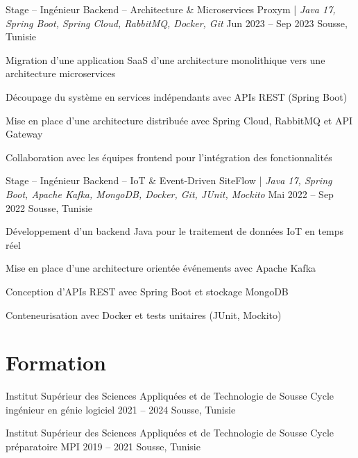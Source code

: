 \documentclass[letterpaper]{resume_config}
\begin{document}
\WorkExperience
{Stage -- Ingénieur Backend -- Architecture \& Microservices}
{Proxym | \textit{Java 17, Spring Boot, Spring Cloud, RabbitMQ, Docker, Git}}
{Jun 2023 -- Sep 2023}
{Sousse, Tunisie}
{
\item Migration d’une application SaaS d’une architecture monolithique vers une architecture microservices
\item Découpage du système en services indépendants avec APIs REST (Spring Boot)
\item Mise en place d’une architecture distribuée avec Spring Cloud, RabbitMQ et API Gateway
\item Collaboration avec les équipes frontend pour l’intégration des fonctionnalités
}

\WorkExperience
{Stage -- Ingénieur Backend -- IoT \& Event-Driven}
{SiteFlow | \textit{Java 17, Spring Boot, Apache Kafka, MongoDB, Docker, Git, JUnit, Mockito}} 
{Mai 2022 -- Sep 2022}
{Sousse, Tunisie}
{
\item Développement d’un backend Java pour le traitement de données IoT en temps réel
\item Mise en place d’une architecture orientée événements avec Apache Kafka
\item Conception d’APIs REST avec Spring Boot et stockage MongoDB
\item Conteneurisation avec Docker et tests unitaires (JUnit, Mockito)
}

\vspace{-10pt}


\section{Formation}

\EducationExperience
{Institut Supérieur des Sciences Appliquées et de Technologie de Sousse}
{Cycle ingénieur en génie logiciel}
{2021 -- 2024}
{Sousse, Tunisie}

\EducationExperience
{Institut Supérieur des Sciences Appliquées et de Technologie de Sousse}
{Cycle préparatoire MPI}
{2019 -- 2021}
{Sousse, Tunisie}

\vspace{-10pt}

\end{document}

